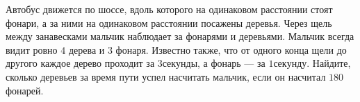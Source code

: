  Автобус движется по шоссе, вдоль которого на одинаковом расстоянии стоят фонари, а за ними на одинаковом расстоянии посажены деревья. Через щель между занавесками мальчик наблюдает за фонарями и деревьями. Мальчик всегда видит ровно $4$ дерева и $3$ фонаря. Известно также, что от одного конца щели до другого каждое дерево проходит за $3\unit{секунды}$, а фонарь --- за $1\unit{секунду}$. Найдите, сколько деревьев за время пути успел насчитать мальчик, если он насчитал $180$ фонарей. 